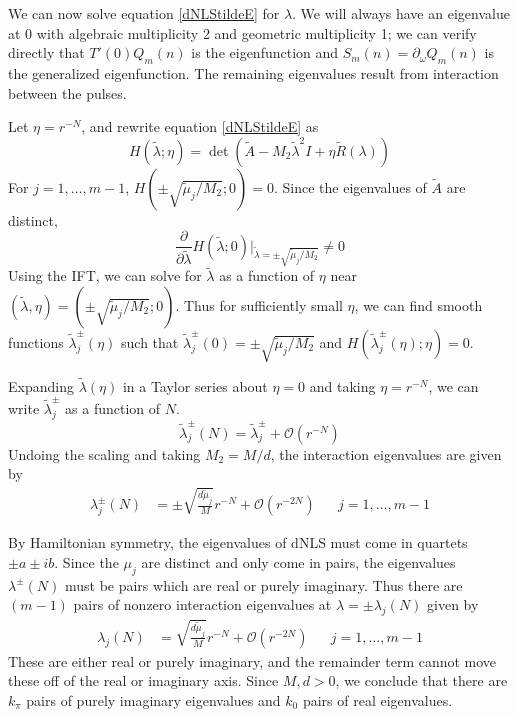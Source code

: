 \documentclass[12pt]{article}
\begin{document}
We can now solve equation \eqref{dNLStildeE} for $\lambda$. We will always have an eigenvalue at 0 with algebraic multiplicity 2 and geometric multiplicity 1; we can verify directly that $T'(0) Q_m(n)$ is the eigenfunction and $S_m(n) = \partial_\omega Q_m(n)$ is the generalized eigenfunction. The remaining eigenvalues result from interaction between the pulses. 

Let $\eta = r^{-N}$, and rewrite equation \eqref{dNLStildeE} as 
\begin{equation}\label{dNLStildeE2}
H(\tilde{\lambda}; \eta) = \det(\tilde{A} - M_2 \tilde{\lambda}^2 I + \eta \tilde{R}(\lambda))
\end{equation}
For $j = 1, \dots, m-1$, $H(\pm \sqrt{\tilde{\mu}_j / M_2 }; 0) = 0$. Since the eigenvalues of $\tilde{A}$ are distinct, 
\[
\frac{\partial}{\partial \tilde{\lambda}} H(\tilde{\lambda}; 0)\Big|_{\tilde{\lambda} = \pm \sqrt{\tilde{\mu}_j / M_2 }} \neq 0
\]
Using the IFT, we can solve for $\tilde{\lambda}$ as a function of $\eta$ near $(\tilde{\lambda}, \eta) = (\pm \sqrt{\tilde{\mu}_j / M_2 }; 0)$. Thus for sufficiently small $\eta$, we can find smooth functions $\tilde{\lambda}_j^\pm(\eta)$ such that $\tilde{\lambda}_j^\pm(0) = \pm \sqrt{\tilde{\mu}_j / M_2 }$ and $H(\tilde{\lambda}_j^\pm(\eta); \eta) = 0$. 

Expanding $\tilde{\lambda}(\eta)$ in a Taylor series about $\eta = 0$ and taking $\eta = r^{-N}$, we can write $\tilde{\lambda}_j^\pm$ as a function of $N$.
\begin{equation*}
\tilde{\lambda}_j^\pm(N) = \tilde{\lambda}_j^\pm + \mathcal{O}(r^{-N})
\end{equation*}
Undoing the scaling and taking $M_2 = M/d$, the interaction eigenvalues are given by
\begin{align*}
\lambda^\pm_j(N) &= \pm \sqrt{\frac{d \tilde{\mu}_j}{M}} r^{-N} + \mathcal{O}(r^{-2N}) && j = 1, \dots, m-1 
\end{align*}

By Hamiltonian symmetry, the eigenvalues of dNLS must come in quartets $\pm a \pm i b$. Since the $\mu_j$ are distinct and only come in pairs, the eigenvalues $\lambda^\pm(N)$ must be pairs which are real or purely imaginary. Thus there are $(m - 1)$ pairs of nonzero interaction eigenvalues at $\lambda = \pm \lambda_j(N)$ given by 
\begin{align*}
\lambda_j(N) &= \sqrt{\frac{d \tilde{\mu}_j}{M}}r^{-N} + \mathcal{O}(r^{-2N}) && j = 1, \dots, m-1
\end{align*}
These are either real or purely imaginary, and the remainder term cannot move these off of the real or imaginary axis. Since $M, d > 0$, we conclude that there are $k_\pi$ pairs of purely imaginary eigenvalues and $k_0$ pairs of real eigenvalues.
\end{document}
